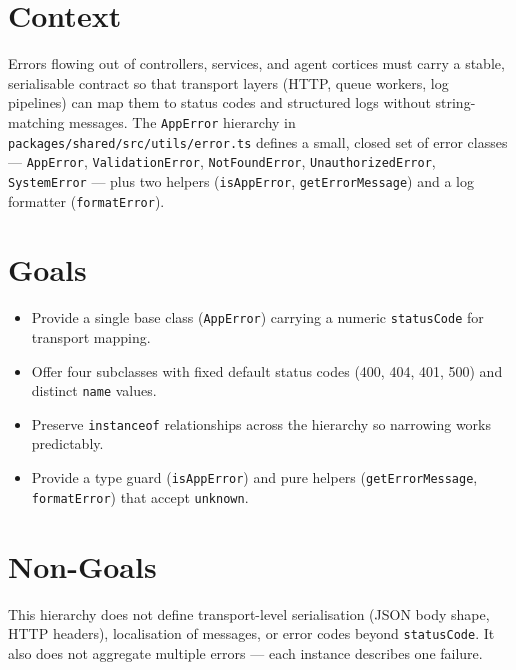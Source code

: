 



\makespecheader

\section{Context}
Errors flowing out of controllers, services, and agent cortices must carry a stable, serialisable contract so that transport layers (HTTP, queue workers, log pipelines) can map them to status codes and structured logs without string-matching messages. The \texttt{AppError} hierarchy in \texttt{packages/shared/src/utils/error.ts} defines a small, closed set of error classes --- \texttt{AppError}, \texttt{ValidationError}, \texttt{NotFoundError}, \texttt{UnauthorizedError}, \texttt{SystemError} --- plus two helpers (\texttt{isAppError}, \texttt{getErrorMessage}) and a log formatter (\texttt{formatError}).

\section{Goals}
\begin{itemize}[leftmargin=1.2em]
  \item Provide a single base class (\texttt{AppError}) carrying a numeric \texttt{statusCode} for transport mapping.
  \item Offer four subclasses with fixed default status codes (400, 404, 401, 500) and distinct \texttt{name} values.
  \item Preserve \texttt{instanceof} relationships across the hierarchy so narrowing works predictably.
  \item Provide a type guard (\texttt{isAppError}) and pure helpers (\texttt{getErrorMessage}, \texttt{formatError}) that accept \texttt{unknown}.
\end{itemize}

\section{Non-Goals}
\begin{nongoal}
This hierarchy does not define transport-level serialisation (JSON body shape, HTTP headers), localisation of messages, or error codes beyond \texttt{statusCode}. It also does not aggregate multiple errors --- each instance describes one failure.
\end{nongoal}

